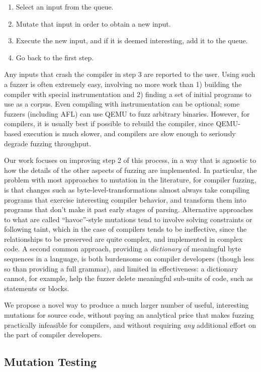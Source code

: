 \begin{enumerate}
\item Select an input from the queue.
\item Mutate that input in order to obtain a new input.
\item Execute the new input, and if it is deemed interesting, add it to the queue.
\item Go back to the first step.
\end{enumerate}

Any inputs that crash the compiler in step 3 are reported to the user.  Using such a fuzzer is often extremely easy, involving no more work than 1) building the compiler with special instrumentation and 2) finding a set of initial programs to use as a corpus.  Even compiling with instrumentation can be optional; some fuzzers (including AFL) can use QEMU to fuzz arbitrary binaries.  However, for compilers, it is usually best if possible to rebuild the compiler, since QEMU-based execution is much slower, and compilers are slow enough to seriously degrade fuzzing throughput.


Our work focuses on improving step 2 of this process, in a way that is agnostic to how the details of the other aspects of fuzzing are implemented.  In particular, the problem with most approaches to mutation in the literature, for compiler fuzzing, is that changes such as byte-level-transformations almost always take compiling programs that exercise interesting compiler behavior, and transform them into programs that don't make it past early stages of parsing.  Alternative approaches to what are called ``havoc''-style mutations tend to involve solving constraints or following taint, which in the case of compilers tends to be ineffective, since the relationships to be preserved are quite complex, and implemented in complex code.  A second common approach, providing a \emph{dictionary} of meaningful byte sequences in a language, is both burdensome on compiler developers (though less so than providing a full grammar), and limited in effectiveness: a dictionary cannot, for example, help the fuzzer delete meaningful sub-units of code, such as statements or blocks.

We propose a novel way to produce a much larger number of useful, interesting mutations for source code, without paying an analytical price that makes fuzzing practically infeasible for compilers, and without requiring \emph{any} additional effort on the part of compiler developers.

\subsection{Mutation Testing}

